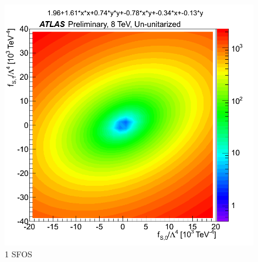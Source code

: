 \begin{figure}[tb]
\centering
\includegraphics[width=.7\textwidth]{figures/aqgc_fits/1SFOS/3lUnUnit_1SFOS.png}
\caption{1 SFOS}
\label{fig:aqgc_fit_1sfos_ununit}
\end{figure}

